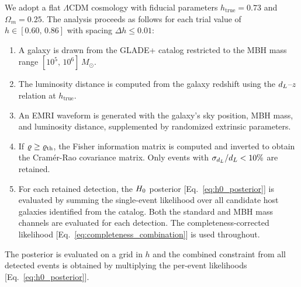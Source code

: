 We adopt a flat $\Lambda$CDM cosmology with fiducial parameters
$h_\mathrm{true} = 0.73$ and $\Omega_m = 0.25$.
The analysis proceeds as follows for each trial value of
$h \in [0.60,\, 0.86]$ with spacing $\Delta h \leq 0.01$:

\begin{enumerate}
  \item A galaxy is drawn from the GLADE+ catalog restricted to the MBH
    mass range $[10^5,\, 10^6]\,M_\odot$.

  \item The luminosity distance is computed from the galaxy redshift
    using the $d_L$--$z$ relation at $h_\mathrm{true}$.

  \item An EMRI waveform is generated with the galaxy's sky position,
    MBH mass, and luminosity distance, supplemented by randomized
    extrinsic parameters.

  \item If $\varrho \geq \varrho_\mathrm{th}$, the Fisher information matrix
    is computed and inverted to obtain the Cram\'er-Rao covariance matrix.
    Only events with $\sigma_{d_L}/d_L < 10\%$ are retained.

  \item For each retained detection, the $H_0$ posterior
    [Eq.~\eqref{eq:h0_posterior}] is evaluated by summing the
    single-event likelihood over all candidate host galaxies identified
    from the catalog.  Both the standard and MBH mass channels are
    evaluated for each detection.  The completeness-corrected likelihood
    [Eq.~\eqref{eq:completeness_combination}] is used throughout.
\end{enumerate}

The posterior is evaluated on a grid in $h$ and the combined constraint
from all detected events is obtained by multiplying the per-event
likelihoods [Eq.~\eqref{eq:h0_posterior}].

